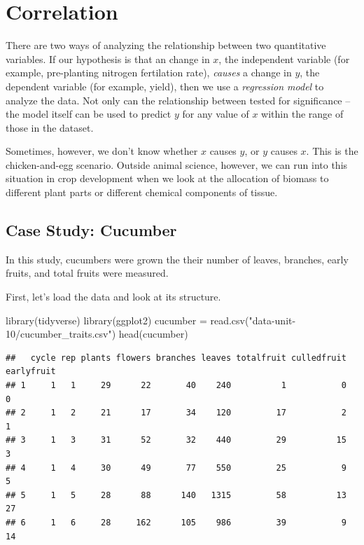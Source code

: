\documentclass[
]{book}
\newenvironment{Shaded}{\begin{snugshade}}{\end{snugshade}}
\newcommand{\FunctionTok}[1]{\textcolor[rgb]{0.00,0.00,0.00}{#1}}
\newcommand{\NormalTok}[1]{#1}
\newcommand{\OtherTok}[1]{\textcolor[rgb]{0.56,0.35,0.01}{#1}}
\newcommand{\StringTok}[1]{\textcolor[rgb]{0.31,0.60,0.02}{#1}}
\begin{document}
\hypertarget{correlation}{%
\section{Correlation}\label{correlation}}

There are two ways of analyzing the relationship between two quantitative variables. If our hypothesis is that an change in \(x\), the independent variable (for example, pre-planting nitrogen fertilation rate), \emph{causes} a change in \(y\), the dependent variable (for example, yield), then we use a \emph{regression model} to analyze the data. Not only can the relationship between tested for significance -- the model itself can be used to predict \(y\) for any value of \(x\) within the range of those in the dataset.

Sometimes, however, we don't know whether \(x\) causes \(y\), or \(y\) causes \(x\). This is the chicken-and-egg scenario. Outside animal science, however, we can run into this situation in crop development when we look at the allocation of biomass to different plant parts or different chemical components of tissue.

\hypertarget{case-study-cucumber}{%
\subsection{Case Study: Cucumber}\label{case-study-cucumber}}

In this study, cucumbers were grown the their number of leaves, branches, early fruits, and total fruits were measured.

First, let's load the data and look at its structure.

\begin{Shaded}
\begin{Highlighting}[]
\FunctionTok{library}\NormalTok{(tidyverse)}
\FunctionTok{library}\NormalTok{(ggplot2)}
\NormalTok{cucumber }\OtherTok{=} \FunctionTok{read.csv}\NormalTok{(}\StringTok{"data{-}unit{-}10/cucumber\_traits.csv"}\NormalTok{)}
\FunctionTok{head}\NormalTok{(cucumber)}
\end{Highlighting}
\end{Shaded}

\begin{verbatim}
##   cycle rep plants flowers branches leaves totalfruit culledfruit earlyfruit
## 1     1   1     29      22       40    240          1           0          0
## 2     1   2     21      17       34    120         17           2          1
## 3     1   3     31      52       32    440         29          15          3
## 4     1   4     30      49       77    550         25           9          5
## 5     1   5     28      88      140   1315         58          13         27
## 6     1   6     28     162      105    986         39           9         14
\end{verbatim}
\end{document}
